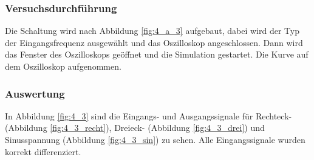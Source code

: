 \documentclass[12pt,a4paper]{article}
\begin{document}
\subsubsection{Versuchsdurchführung}

Die Schaltung wird nach Abbildung \ref{fig:4_a_3} aufgebaut, dabei wird der Typ der Eingangsfrequenz ausgewählt und das Oszilloskop angeschlossen. Dann wird das Fenster des Oszilloskops geöffnet und die Simulation gestartet. Die Kurve auf dem Oszilloskop aufgenommen.

\subsubsection{Auswertung}

In Abbildung \ref{fig:4_3} sind die Eingangs- und Ausgangssignale für Rechteck- (Abbildung \ref{fig:4_3_recht}), Dreieck- (Abbildung \ref{fig:4_3_drei}) und Sinusspannung (Abbildung \ref{fig:4_3_sin}) zu sehen. Alle Eingangssignale wurden korrekt differenziert.
\end{document}
